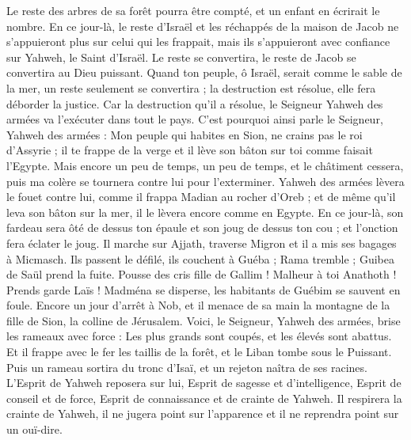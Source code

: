 \begin{multicols}{2}
Le reste des arbres de sa forêt pourra être compté, et un enfant en écrirait le nombre.
En ce jour-là, le reste d'Israël et les réchappés de la maison de Jacob ne s'appuieront plus sur celui qui les frappait, mais ils s'appuieront avec confiance sur Yahweh, le Saint d'Israël.
Le reste se convertira, le reste de Jacob se convertira au Dieu puissant.
Quand ton peuple, ô Israël, serait comme le sable de la mer, un reste seulement se convertira ; la destruction est résolue, elle fera déborder la justice.
Car la destruction qu'il a résolue, le Seigneur Yahweh des armées va l'exécuter dans tout le pays.
C'est pourquoi ainsi parle le Seigneur, Yahweh des armées : Mon peuple qui habites en Sion, ne crains pas le roi d'Assyrie ; il te frappe de la verge et il lève son bâton sur toi comme faisait l'Egypte.
Mais encore un peu de temps, un peu de temps, et le châtiment cessera, puis ma colère se tournera contre lui pour l'exterminer.
Yahweh des armées lèvera le fouet contre lui, comme il frappa Madian au rocher d'Oreb ; et de même qu'il leva son bâton sur la mer, il le lèvera encore comme en Egypte.
En ce jour-là, son fardeau sera ôté de dessus ton épaule et son joug de dessus ton cou ; et l'onction fera éclater le joug.
Il marche sur Ajjath, traverse Migron et il a mis ses bagages à Micmasch.
Ils passent le défilé, ils couchent à Guéba ; Rama tremble ; Guibea de Saül prend la fuite.
Pousse des cris fille de Gallim ! Malheur à toi Anathoth ! Prends garde Laïs !
Madména se disperse, les habitants de Guébim se sauvent en foule.
Encore un jour d'arrêt à Nob, et il menace de sa main la montagne de la fille de Sion, la colline de Jérusalem.
Voici, le Seigneur, Yahweh des armées, brise les rameaux avec force : Les plus grands sont coupés, et les élevés sont abattus.
Et il frappe avec le fer les taillis de la forêt, et le Liban tombe sous le Puissant.
\VerseOne{}Puis un rameau sortira du tronc d'Isaï, et un rejeton naîtra de ses racines.
L'Esprit de Yahweh reposera sur lui, Esprit de sagesse et d'intelligence, Esprit de conseil et de force, Esprit de connaissance et de crainte de Yahweh.
Il respirera la crainte de Yahweh, il ne jugera point sur l'apparence et il ne reprendra point sur un ouï-dire.

\end{multicols}
